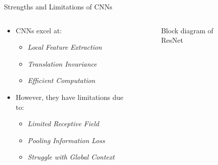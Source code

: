 \begin{frame}{Strengths and Limitations of CNNs}
    \begin{columns}
        \begin{column}{0.55\linewidth}
            \begin{itemize}
                \item CNNs excel at:
                \begin{itemize}
                    \item \emph{Local Feature Extraction} 
                    \item \emph{Translation Invariance} 
                    \item \emph{Efficient Computation} 
                \end{itemize}
                \item However, they have limitations due to:
                \begin{itemize}
                    \item \emph{Limited Receptive Field} 
                    \item \emph{Pooling Information Loss} 
                    \item \emph{Struggle with Global Context} 
                \end{itemize}
            \end{itemize}
        \end{column}
        \begin{column}{0.45\linewidth}
            \begin{figure}
                \centering
                
                \caption{Block diagram of ResNet}
                \label{fig:resnet}
            \end{figure}
        \end{column}
    \end{columns}
\end{frame}





